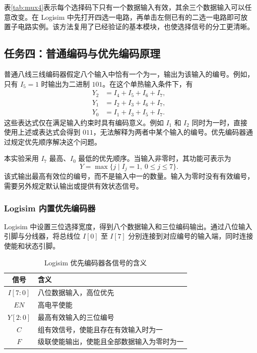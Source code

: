 \documentclass[12pt,a4paper,fontset=fandol]{ctexart}
\begin{document}
表\ref{tab:mux4}表示每个选择码下只有一个数据输入有效，其余三个数据输入可以任意改变。在 Logisim 中先打开四选一电路，再单击左侧已有的二选一电路即可放置子电路实例。该方法复用了已经验证的基本模块，也使选择信号的分工更清晰。

\subsection{任务四：普通编码与优先编码原理}

普通八线三线编码器假定八个输入中恰有一个为一，输出为该输入的编号。例如，只有 $I_5=1$ 时输出为二进制 $101$。在这个单热输入条件下，有
\begin{align}
  Y_2&=I_4+I_5+I_6+I_7,\\
  Y_1&=I_2+I_3+I_6+I_7,\\
  Y_0&=I_1+I_3+I_5+I_7.
\end{align}
这些表达式仅在满足输入约束时具有编码意义。例如 $I_1$ 和 $I_2$ 同时为一时，直接使用上述或表达式会得到 $011$，无法解释为两者中某个输入的编号。优先编码器通过规定优先顺序解决这个问题。

本实验采用 $I_7$ 最高、$I_0$ 最低的优先顺序。当输入非零时，其功能可表示为
\begin{equation}
  Y=\max\{j\mid I_j=1,\ 0\leq j\leq7\}.
\end{equation}
该式输出最高有效位的编号，而不是输入中一的数量。输入为零时没有有效编号，需要另外规定默认输出或提供有效状态信号。

\subsubsection{Logisim 内置优先编码器}

Logisim 中设置三位选择宽度，得到八个数据输入和三位编码输出。通过八位输入引脚与分线器，将总线位 $I[0]$ 至 $I[7]$ 分别连接到对应编号的输入端，同时连接使能和状态引脚。

\begin{table}[H]
\centering
\caption{Logisim 优先编码器各信号的含义}
\label{tab:priority-ports}
\begin{tabular}{cp{12.0cm}}
\toprule
信号 & 含义 \\
\midrule
$I[7:0]$ & 八位数据输入，高位优先 \\
$EN$ & 高电平使能 \\
$Y[2:0]$ & 最高有效输入的三位编号 \\
$C$ & 组有效信号，使能且存在有效输入时为一 \\
$F$ & 级联使能输出，使能且全部数据输入为零时为一 \\
\bottomrule
\end{tabular}
\end{table}
\end{document}

